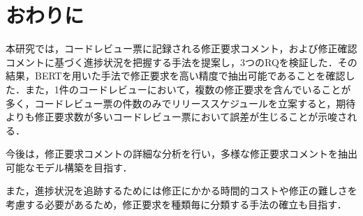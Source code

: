 \documentclass[11pt]{jreport}
\begin{document}
\chapter{おわりに}

本研究では，コードレビュー票に記録される修正要求コメント，および修正確認コメントに基づく進捗状況を把握する手法を提案し，3つのRQを検証した．その結果，BERTを用いた手法で修正要求を高い精度で抽出可能であることを確認した．また，1件のコードレビューにおいて，複数の修正要求を含んでいることが多く，コードレビュー票の件数のみでリリーススケジュールを立案すると，期待よりも修正要求数が多いコードレビュー票において誤差が生じることが示唆される．

今後は，修正要求コメントの詳細な分析を行い，多様な修正要求コメントを抽出可能なモデル構築を目指す．

また，進捗状況を追跡するためには修正にかかる時間的コストや修正の難しさを考慮する必要があるため，修正要求を種類毎に分類する手法の確立も目指す．



\end{document}
